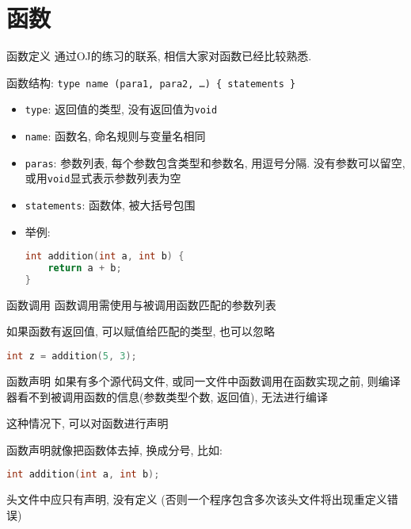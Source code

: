 \section{函数}\label{sec:函数}

\begin{frame}[fragile]{函数定义}
    通过OJ的练习的联系, 相信大家对函数已经比较熟悉.

    函数结构: \texttt{type name (para1, para2, \ldots) \{ statements \}}

    \begin{itemize}[<+- | alert@+>]
        \item \texttt{type}: 返回值的类型, 没有返回值为\texttt{void}
        \item \texttt{name}: 函数名, 命名规则与变量名相同
        \item \texttt{paras}: 参数列表, 每个参数包含类型和参数名, 用逗号分隔.
        没有参数可以留空, 或用\texttt{void}显式表示参数列表为空
        \item \texttt{statements}: 函数体, 被大括号包围
        \item 举例:
        \begin{lstlisting}[language=c]
int addition(int a, int b) {
    return a + b;
}
        \end{lstlisting}
    \end{itemize}
\end{frame}

\begin{frame}[fragile]{函数调用}
    函数调用需使用与被调用函数匹配的参数列表

    如果函数有返回值, 可以赋值给匹配的类型, 也可以忽略

    \emptyline
    \begin{lstlisting}[language=c]
int z = addition(5, 3);
    \end{lstlisting}
\end{frame}

\begin{frame}[fragile]{函数声明}
    如果有多个源代码文件, 或同一文件中函数调用在函数实现之前,
    则编译器看不到被调用函数的信息(参数类型个数, 返回值), 无法进行编译

    这种情况下, 可以对函数进行声明

    函数声明就像把函数体去掉, 换成分号, 比如:
    \begin{lstlisting}[language=c]
int addition(int a, int b);
    \end{lstlisting}

    头文件中应只有声明, 没有定义 (否则一个程序包含多次该头文件将出现重定义错误)
\end{frame}

